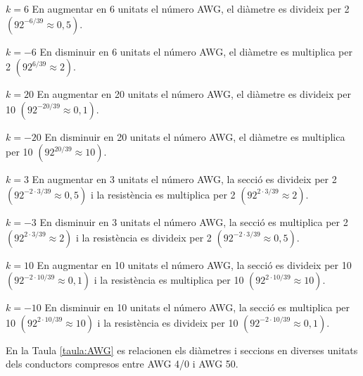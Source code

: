 \begin{list}{}
   {\setlength{\labelwidth}{15mm} \setlength{\leftmargin}{17mm} \setlength{\labelsep}{2mm}}

   \item[$k=6$\hfill] En augmentar en 6  unitats el n\'{u}mero AWG, el di\`{a}metre es divideix per 2
                 $(92^{-6/39}\approx 0{,}5)$.

   \item[$k=-6$\hfill] En disminuir en 6 unitats el n\'{u}mero AWG, el di\`{a}metre es multiplica per 2
                 $(92^{6/39}\approx 2)$.

   \item[$k=20$\hfill] En augmentar en 20  unitats el n\'{u}mero AWG, el di\`{a}metre es divideix per 10
                 $(92^{-20/39}\approx 0{,}1)$.

   \item[$k=-20$\hfill] En disminuir en 20 unitats el n\'{u}mero AWG, el di\`{a}metre es multiplica per 10
                 $(92^{20/39}\approx 10)$.

   \item[$k=3$\hfill] En augmentar en 3 unitats el n\'{u}mero AWG, la secci\'{o} es divideix per 2
                 $(92^{-2\cdot3/39}\approx 0{,}5)$ i la resist\`{e}ncia es multiplica per 2
                 $(92^{2\cdot3/39}\approx 2)$.

   \item[$k=-3$\hfill] En disminuir en 3 unitats el n\'{u}mero AWG, la secci\'{o} es multiplica per 2
                  $(92^{2\cdot3/39}\approx 2)$ i la resist\`{e}ncia es divideix per 2
                  $(92^{-2\cdot3/39}\approx 0{,}5)$.

   \item[$k=10$\hfill] En augmentar en 10 unitats el n\'{u}mero AWG, la secci\'{o} es divideix per 10
                 $(92^{-2\cdot10/39}\approx 0{,}1)$ i la resist\`{e}ncia es multiplica per 10
                 $(92^{2\cdot10/39}\approx 10)$.

   \item[$k=-10$\hfill] En disminuir en 10 unitats el n\'{u}mero AWG, la secci\'{o} es multiplica per 10
                  $(92^{2\cdot10/39}\approx 10)$ i la resist\`{e}ncia es divideix per 10
                  $(92^{-2\cdot10/39}\approx 0{,}1)$.
\end{list}

En la Taula \vref{taula:AWG} es relacionen els di\`{a}metres i seccions en diverses unitats dels conductors compresos entre AWG 4/0 i AWG 50.



